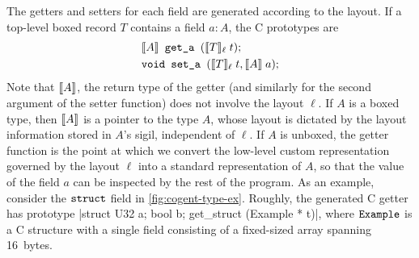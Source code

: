 The getters and setters for each field are generated
according to the layout. If a top-level boxed record $T$ contains
a field $a : A$, the C prototypes are
\begin{align*}
    & \llbracket  A  \rrbracket \texttt{ get\_a }(\llbracket  T  \rrbracket_\ell \; t) ;
\\
    & \texttt{void set\_a }(\llbracket  T  \rrbracket_\ell  \; t, \llbracket  A  \rrbracket \; a) ;
\end{align*}
Note that $\llbracket A \rrbracket$, the return type of the getter (and similarly for
the second argument of the setter function) does not involve the
layout $\ell$. If $A$ is a boxed type, then $\llbracket A \rrbracket$ is a pointer to the
type $A$, whose layout is dictated by the layout information stored in
$A$'s sigil, independent of $\ell$. If $A$ is unboxed, the getter function is the point at which
we convert the low-level custom representation governed by the layout $\ell$
into a standard representation of $A$, so that the value of the field
$a$ can be inspected by the rest of the program. 
As an example, consider the $\texttt{struct}$ field in \autoref{fig:cogent-type-ex}.
Roughly, the generated C getter has prototype
\cc|struct { U32 a; bool b; } get_struct (Example * t)|, where
$\texttt{Example}$ is a C structure with a single field consisting of a fixed-sized array
spanning 16~bytes.




